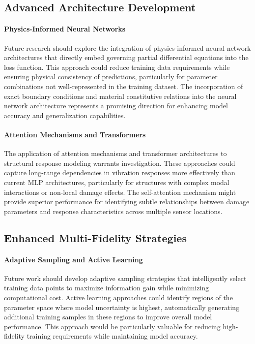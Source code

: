 \subsection{Advanced Architecture Development}
\paragraph{Physics-Informed Neural Networks}
Future research should explore the integration of physics-informed neural network architectures that directly embed governing partial differential equations into the loss function. This approach could reduce training data requirements while ensuring physical consistency of predictions, particularly for parameter combinations not well-represented in the training dataset. The incorporation of exact boundary conditions and material constitutive relations into the neural network architecture represents a promising direction for enhancing model accuracy and generalization capabilities.

\paragraph{Attention Mechanisms and Transformers}
The application of attention mechanisms and transformer architectures to structural response modeling warrants investigation. These approaches could capture long-range dependencies in vibration responses more effectively than current MLP architectures, particularly for structures with complex modal interactions or non-local damage effects. The self-attention mechanism might provide superior performance for identifying subtle relationships between damage parameters and response characteristics across multiple sensor locations.

\subsection{Enhanced Multi-Fidelity Strategies}
\paragraph{Adaptive Sampling and Active Learning}
Future work should develop adaptive sampling strategies that intelligently select training data points to maximize information gain while minimizing computational cost. Active learning approaches could identify regions of the parameter space where model uncertainty is highest, automatically generating additional training samples in these regions to improve overall model performance. This approach would be particularly valuable for reducing high-fidelity training requirements while maintaining model accuracy.

